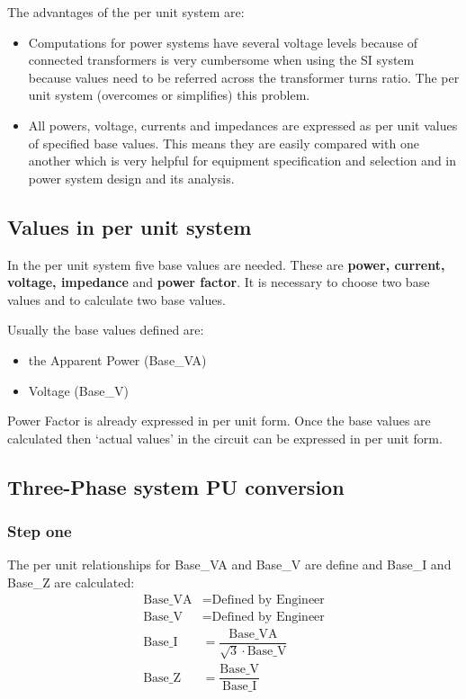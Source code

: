 The advantages of the per unit system are:
\begin{itemize}
	\item Computations for power systems have several voltage levels because of connected transformers is very cumbersome when using the SI system because values need to be referred across the transformer turns ratio. The per unit system (overcomes or simplifies) this problem.
	\item All powers, voltage, currents and impedances are expressed as per unit values of specified base values. This means they are easily compared with one another which is very helpful for equipment specification and selection and in power system design and its analysis.
\end{itemize}
\subsection{Values in per unit system}
In the per unit system five base values are needed. These are \textbf{power, current, voltage, impedance} and \textbf{power factor}. It is necessary to choose two base values and to calculate two base values.

Usually the base values defined are:
\begin{itemize}
	\item the Apparent Power (Base\_VA)
	\item Voltage (Base\_V)
\end{itemize}
Power Factor is already expressed in per unit form. Once the base values are calculated then `actual values' in the circuit can be expressed in per unit form.
\subsection{Three-Phase system PU conversion}
\subsubsection{Step one}
The per unit relationships for Base\_VA and Base\_V are define and Base\_I and Base\_Z are calculated:
\begin{align}
	\textrm{Base\_VA} & = \textrm{Defined by Engineer}                              \\
	\textrm{Base\_V}  & = \textrm{Defined by Engineer}                              \\
	\textrm{Base\_I}  & = \dfrac{\textrm{Base\_VA}}{\sqrt{3}\cdot \textrm{Base\_V}} \\
	\textrm{Base\_Z}  & = \dfrac{\textrm{Base\_V}}{\textrm{Base\_I}}
\end{align}
